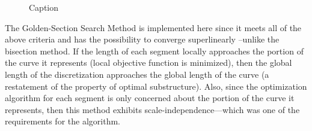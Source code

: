 \begin{figure}[h!]
  \caption{\label{OptimizationFunctionExample} Caption}
\end{figure}

The Golden-Section Search Method is implemented here since it meets all of the above criteria and has the possibility to converge superlinearly \cite{brent73}--unlike the bisection method.  If the length of each segment locally approaches the portion of the curve it represents (local objective function is minimized), then the global length of the discretization approaches the global length of the curve (a restatement of the property of optimal substructure).  Also, since the optimization algorithm for each segment is only concerned about the portion of the curve it represents, then this method exhibits scale-independence—which was one of the requirements for the algorithm.

